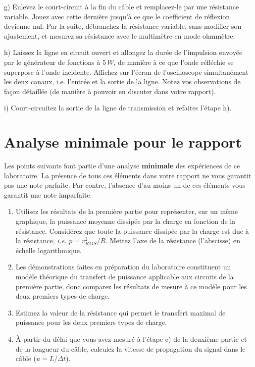 \documentclass[canadien,12pt,oneside,letterpaper]{article}
\begin{document}
g) Enlevez le court-circuit à la fin du câble et remplacez-le par une résistance variable. Jouez avec cette dernière jusqu'à ce que le coefficient de réflexion devienne nul. Par la suite, débranchez la résistance variable, sans modifier son ajustement, et mesurez sa résistance avec le multimètre en mode ohmmètre.

h) Laissez la ligne en circuit ouvert et allongez la durée de l'impulsion envoyée par le générateur de fonctions à $5\,W$, de manière à ce que l'onde réfléchie se superpose à l'onde incidente. Affichez sur l'écran de l'oscilloscope simultanément les deux canaux, i.e. l'entrée et la sortie de la ligne. Notez vos observations de façon détaillée (de manière à pouvoir en discuter dans votre rapport).

i) Court-circuitez la sortie de la ligne de transmission et refaites l'étape h).


\section{Analyse minimale pour le rapport}

Les points suivants font partie d'une analyse \textbf{minimale} des expériences de ce laboratoire. La présence de tous ces éléments dans votre rapport ne vous garantit pas une note parfaite. Par contre, l'absence d'au moins un de ces éléments vous garantit une note imparfaite.

\begin{enumerate}
    \item Utilisez les résultats de la première partie pour représenter, sur un même graphique, la puissance moyenne dissipée par la charge en fonction de la résistance. Considérez que toute la puissance dissipée par la charge est due à la résistance, \textit{i.e.} $p=v_{RMS}^2/R$. Mettez l'axe de la résistance (l'abscisse) en échelle logarithmique. 
    \item Les démonstrations faites en préparation du laboratoire constituent un modèle théorique du transfert de puissance applicable aux circuits de la première partie, donc comparez les résultats de mesure à ce modèle pour les deux premiers types de charge.
    \item Estimez la valeur de la résistance qui permet le transfert maximal de puissance pour les deux premiers types de charge.
    \item À partir du délai que vous avez mesuré à l'étape c) de la deuxième partie et de la longueur du câble, calculez la vitesse de propagation du signal dans le câble ($u=L/\Delta t$).
\end{enumerate}
\end{document}
